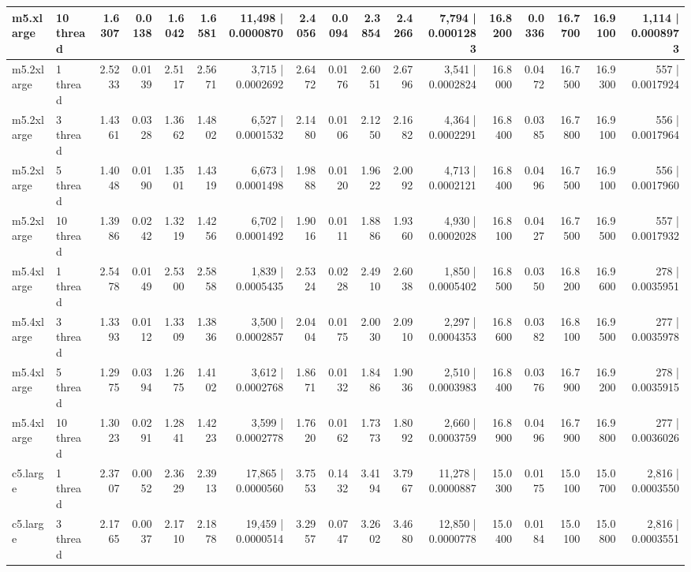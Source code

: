 \documentclass[conference]{IEEEtran}
\begin{document}
\begin{table}[h]
{\begin{tabular}{ll|rrrrr|rrrrr|rrrrr}
			m5.xlarge & 10 thread & 1.6307 & 0.0138 & 1.6042 & 1.6581 & 11,498 | 0.0000870 & 2.4056 & 0.0094 & 2.3854 & 2.4266 & 7,794 | 0.0001283 & 16.8200 & 0.0336 & 16.7700 & 16.9100 & 1,114 | 0.0008973 \\
			\midrule
			m5.2xlarge & 1 thread & 2.5233 & 0.0139 & 2.5117 & 2.5671 & 3,715 | 0.0002692 & 2.6472 & 0.0176 & 2.6051 & 2.6796 & 3,541 | 0.0002824 & 16.8000 & 0.0472 & 16.7500 & 16.9300 & 557 | 0.0017924 \\
			m5.2xlarge & 3 thread & 1.4361 & 0.0328 & 1.3662 & 1.4802 & 6,527 | 0.0001532 & 2.1480 & 0.0106 & 2.1250 & 2.1682 & 4,364 | 0.0002291 & 16.8400 & 0.0385 & 16.7800 & 16.9100 & 556 | 0.0017964 \\
			m5.2xlarge & 5 thread & 1.4048 & 0.0190 & 1.3501 & 1.4319 & 6,673 | 0.0001498 & 1.9888 & 0.0120 & 1.9622 & 2.0092 & 4,713 | 0.0002121 & 16.8400 & 0.0496 & 16.7500 & 16.9100 & 556 | 0.0017960 \\
			m5.2xlarge & 10 thread & 1.3986 & 0.0242 & 1.3219 & 1.4256 & 6,702 | 0.0001492 & 1.9016 & 0.0111 & 1.8886 & 1.9360 & 4,930 | 0.0002028 & 16.8100 & 0.0427 & 16.7500 & 16.9500 & 557 | 0.0017932 \\
			\midrule
			m5.4xlarge & 1 thread & 2.5478 & 0.0149 & 2.5300 & 2.5858 & 1,839 | 0.0005435 & 2.5324 & 0.0228 & 2.4910 & 2.6038 & 1,850 | 0.0005402 & 16.8500 & 0.0350 & 16.8200 & 16.9600 & 278 | 0.0035951 \\
			m5.4xlarge & 3 thread & 1.3393 & 0.0112 & 1.3309 & 1.3836 & 3,500 | 0.0002857 & 2.0404 & 0.0175 & 2.0030 & 2.0910 & 2,297 | 0.0004353 & 16.8600 & 0.0382 & 16.8100 & 16.9500 & 277 | 0.0035978 \\
			m5.4xlarge & 5 thread & 1.2975 & 0.0394 & 1.2675 & 1.4102 & 3,612 | 0.0002768 & 1.8671 & 0.0132 & 1.8486 & 1.9036 & 2,510 | 0.0003983 & 16.8400 & 0.0376 & 16.7900 & 16.9200 & 278 | 0.0035915 \\
			m5.4xlarge & 10 thread & 1.3023 & 0.0291 & 1.2841 & 1.4223 & 3,599 | 0.0002778 & 1.7620 & 0.0162 & 1.7373 & 1.8092 & 2,660 | 0.0003759 & 16.8900 & 0.0496 & 16.7900 & 16.9800 & 277 | 0.0036026 \\
			\midrule\midrule
			c5.large & 1 thread & 2.3707 & 0.0052 & 2.3629 & 2.3913 & 17,865 | 0.0000560 & 3.7553 & 0.1432 & 3.4194 & 3.7967 & 11,278 | 0.0000887 & 15.0300 & 0.0175 & 15.0100 & 15.0700 & 2,816 | 0.0003550 \\
			c5.large & 3 thread & 2.1765 & 0.0037 & 2.1710 & 2.1878 & 19,459 | 0.0000514 & 3.2957 & 0.0747 & 3.2602 & 3.4680 & 12,850 | 0.0000778 & 15.0400 & 0.0184 & 15.0100 & 15.0800 & 2,816 | 0.0003551 \\

\end{tabular}}
\end{table}
\end{document}
